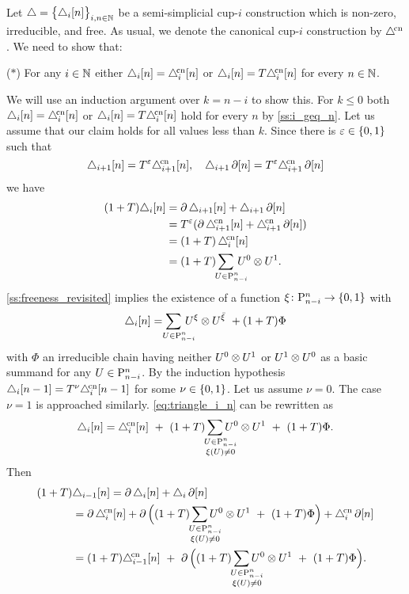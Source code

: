 Let $\triangle = \set[\big]{\triangle_i [n]}_{i,n\in\N}$ be a semi-simplicial \mbox{cup-$i$} construction which is non-zero, irreducible, and free.
As usual, we denote the canonical \mbox{cup-$i$} construction by $\canonical$.
We need to show that:
\begin{center}
	($\ast$) For any $i \in \N$ either $\triangle_i [n] = \canonical_ i [n]$ or $\triangle_i [n] = T\canonical_ i [n]$ for every $n \in \N$.
\end{center}
We will use an induction argument over $k = n-i$ to show this.
For $k \leq 0$ both $\triangle_i [n] = \canonical_ i [n]$ or $\triangle_i [n] = T\canonical_ i [n]$ hold for every $n$ by \cref{ss:i_geq_n}.
Let us assume that our claim holds for all values less than $k$.
Since there is $\varepsilon \in \set{0,1}$ such that
\[
\triangle_{i+1}[n] = T^\varepsilon\canonical_{i+1}[n], \quad
\triangle_{i+1}\bd[n] = T^\varepsilon\canonical_{i+1}\bd[n]
\]
we have
\begin{align*}
	(1+T)\triangle_i[n] &=
	\bd\triangle_{i+1}[n] + \triangle_{i+1}\bd[n] \\ &=
	T^\varepsilon(\bd\canonical_{i+1}[n] + \canonical_{i+1}\bd[n]) \\ &=
	(1+T)\,\canonical_i[n] \\ &=
	(1+T)\sum_{\mathclap{\quad U \in \P_{n-i}^n}} \, U^0 \ot U^1.
\end{align*}
\cref{ss:freeness_revisited} implies the existence of a function $\xi \colon \P_{n-i}^n \to \set{0,1}$ with
\begin{equation}\label{eq:triangle_i_n}
	\triangle_i[n] =
	\sum_{\mathclap{\quad U \in \P_{n-i}^n}} \, U^{\xi} \ot U^{\barxi} \ +
	(1+T)\Phi
\end{equation}
with $\Phi$ an irreducible chain having neither $U^0 \ot U^1$ or $U^1 \ot U^0$ as a basic summand for any $U \in \P_{n-i}^n$.
By the induction hypothesis $\triangle_i[n-1] = T^\nu\canonical_i[n-1]$ for some $\nu \in \set{0,1}$.
Let us assume $\nu = 0$.
The case $\nu = 1$ is approached similarly.
\cref{eq:triangle_i_n} can be rewritten as
\[
\triangle_i[n] = \canonical_i[n] \ +\
(1+T)\sum_{\quad\mathclap{\substack{U \in \P_{n-i}^n \\ \xi(U) \neq 0}}} U^0 \ot U^1 \ + \
(1+T)\Phi.
\]
Then
\begin{equation}\label{eq:main proof a}
	\begin{split}
		(1+T)&\triangle_{i-1}[n] =
		\bd \triangle_{i}[n] + \triangle_{i}\bd[n] \\ &=
		\bd \canonical_{i}[n] +
		\bd\Big(
		(1+T)\sum_{\quad\mathclap{\substack{U \in \P_{n-i}^n \\ \xi(U) \neq 0}}} U^0 \ot U^1 \ +\
		(1+T)\Phi
		\Big) +
		\canonical_{i}\bd[n] \\ &=
		(1+T)\canonical_{i-1}[n] \ +\
		\bd\Big(
		(1+T)\sum_{\quad\mathclap{\substack{U \in \P_{n-i}^n \\ \xi(U) \neq 0}}} U^0 \ot U^1 \ +\
		(1+T)\Phi
		\Big).
	\end{split}
\end{equation}
